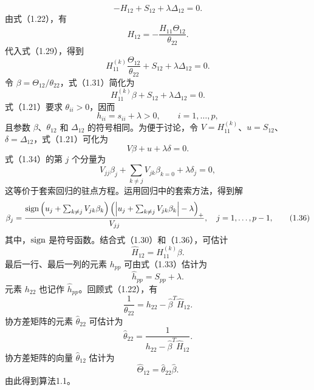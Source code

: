 \begin{equation}
-H_{12}+S_{12}+\lambda\Delta_{12}=0.
\tag{1.29}
\end{equation}
由式（1.22），有
\begin{equation}
H_{12}=-\frac{H_{11}\Theta_{12}}{\theta_{22}}.
\tag{1.30}
\end{equation}
代入式（1.29），得到
\begin{equation}
H_{11}^{(k)}\frac{\Theta_{12}}{\theta_{22}}+S_{12}+\lambda\Delta_{12}=0.
\tag{1.31}
\end{equation}
令 $\beta=\Theta_{12}/\theta_{22}$，式（1.31）简化为
\begin{equation}
H_{11}^{(k)}\beta+S_{12}+\lambda\Delta_{12}=0.
\tag{1.32}
\end{equation}
式（1.21）要求 $\theta_{ii}>0$，因而
\begin{equation}
h_{ii}=s_{ii}+\lambda>0,\qquad i=1,\ldots,p,
\tag{1.33}
\end{equation}
且参数 $\beta$、$\theta_{12}$ 和 $\Delta_{12}$ 的符号相同。为便于讨论，令 $V=H_{11}^{(k)}$、$u=S_{12}$、$\delta=\Delta_{12}$，式（1.21）可化为
\begin{equation}
V\beta+u+\lambda\delta=0.
\tag{1.34}
\end{equation}
式（1.34）的第 $j$ 个分量为
\begin{equation}
V_{jj}\beta_j+\sum_{k\ne j}V_{jk}\beta_{k=0}+\lambda\delta_j=0,
\tag{1.35}
\end{equation}
这等价于套索回归的驻点方程。运用回归中的套索方法，得到解
\begin{equation}
\beta_j=\frac{\operatorname{sign}\left(u_j+\sum_{k\ne j}V_{jk}\beta_k\right)
\left(\left|u_j+\sum_{k\ne j}V_{jk}\beta_k\right|-\lambda\right)_+}{V_{jj}},
\quad j=1,\ldots,p-1,
\tag{1.36}
\end{equation}
其中，$\operatorname{sign}$ 是符号函数。结合式（1.30）和（1.36），可估计
\[
\widehat H_{12}=H_{11}^{(k)}\beta.
\]
最后一行、最后一列的元素 $h_{pp}$ 可由式（1.33）估计为
\[
\widehat h_{pp}=S_{pp}+\lambda.
\]
元素 $h_{22}$ 也记作 $\widehat h_{pp}$。回顾式（1.22），有
\[
\frac1{\theta_{22}}=h_{22}-\widehat\beta^T\widehat H_{12}.
\]
协方差矩阵的元素 $\widehat\theta_{22}$ 可估计为
\begin{equation}
\widehat\theta_{22}=\frac1{h_{22}-\widehat\beta^T\widehat H_{12}}.
\tag{1.37}
\end{equation}
协方差矩阵的向量 $\widehat\theta_{12}$ 估计为
\[
\widehat\Theta_{12}=\widehat\theta_{22}\widehat\beta.
\]
由此得到算法1.1。

